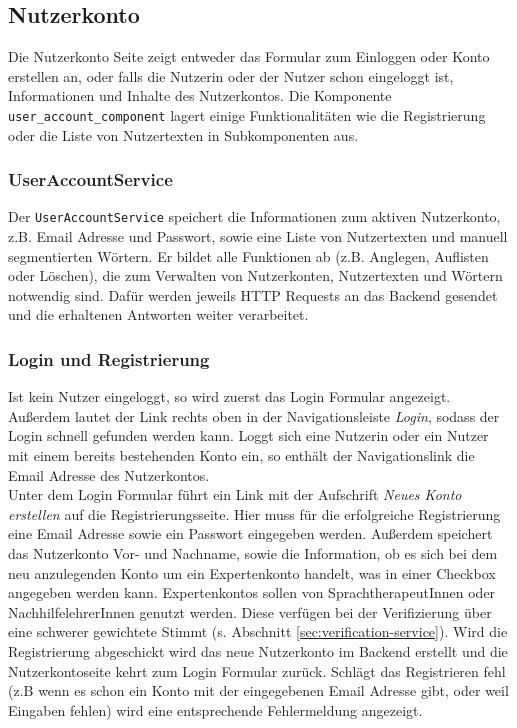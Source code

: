 \subsection{Nutzerkonto}
\label{sec:nutzerkonto}

Die Nutzerkonto Seite zeigt entweder das Formular zum Einloggen oder Konto erstellen an, oder falls die Nutzerin oder der Nutzer schon eingeloggt ist, Informationen und Inhalte des Nutzerkontos. Die Komponente \texttt{user\_account\_component} lagert einige Funktionalitäten wie die Registrierung oder die Liste von Nutzertexten in Subkomponenten aus.

\subsubsection{UserAccountService}

Der \texttt{UserAccountService} speichert die Informationen zum aktiven Nutzerkonto, z.B. Email Adresse und Passwort, sowie eine Liste von Nutzertexten und manuell segmentierten Wörtern. Er bildet alle Funktionen ab (z.B. Anglegen, Auflisten oder Löschen), die zum Verwalten von Nutzerkonten, Nutzertexten und Wörtern notwendig sind. Dafür werden jeweils HTTP Requests an das Backend gesendet und die erhaltenen Antworten weiter verarbeitet.

\subsubsection{Login und Registrierung}

Ist kein Nutzer eingeloggt, so wird zuerst das Login Formular angezeigt. Außerdem lautet der Link rechts oben in der Navigationsleiste \textit{Login}, sodass der Login schnell gefunden werden kann. Loggt sich eine Nutzerin oder ein Nutzer mit einem bereits bestehenden Konto ein, so enthält der Navigationslink die Email Adresse des Nutzerkontos.\\

Unter dem Login Formular führt ein Link mit der Aufschrift \textit{Neues Konto erstellen} auf die Registrierungsseite. Hier muss für die erfolgreiche Registrierung eine Email Adresse sowie ein Passwort eingegeben werden. Außerdem speichert das Nutzerkonto Vor- und Nachname, sowie die Information, ob es sich bei dem neu anzulegenden Konto um ein Expertenkonto handelt, was in einer Checkbox angegeben werden kann. Expertenkontos sollen von SprachtherapeutInnen oder NachhilfelehrerInnen genutzt werden.  Diese verfügen bei der Verifizierung über eine schwerer gewichtete Stimmt (s. Abschnitt \ref{sec:verification-service}). Wird die Registrierung abgeschickt wird das neue Nutzerkonto im Backend erstellt und die Nutzerkontoseite kehrt zum Login Formular zurück. Schlägt das Registrieren fehl (z.B wenn es schon ein Konto mit der eingegebenen Email Adresse gibt, oder weil Eingaben fehlen) wird eine entsprechende Fehlermeldung angezeigt.


